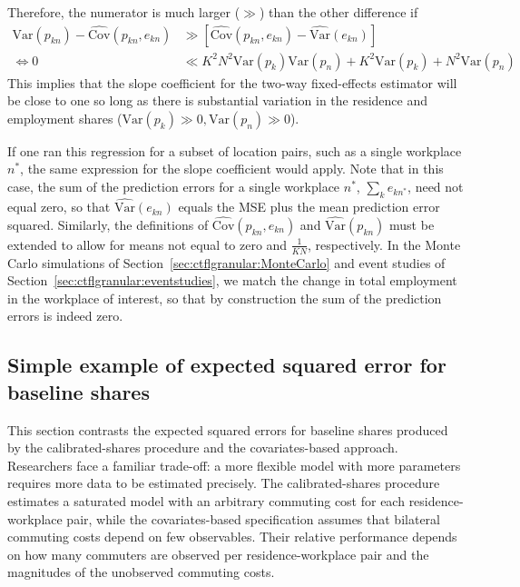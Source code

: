 \documentclass[11pt]{article}
\theoremstyle{definition}
\begin{document}
Therefore, the numerator is much larger ($\gg$) than the other difference if
\begin{align*}
\text{Var}(p_{kn}) - \widehat{\text{Cov}}(p_{kn},e_{kn})
&\gg
\left[\widehat{\text{Cov}}(p_{kn},e_{kn}) - \widehat{\text{Var}}(e_{kn})\right]
\\
\iff
0
&\ll
K^2 N^2 \text{Var}(p_{k}) \text{Var}(p_{n}) + K^2 \text{Var}(p_{k}) + N^2 \text{Var}(p_{n}) 
\end{align*}
This implies that the slope coefficient for the two-way fixed-effects estimator will be close to one so long as there is substantial variation in the residence and employment shares
($\text{Var}(p_{k}) \gg 0, \text{Var}(p_{n}) \gg 0$).

If one ran this regression for a subset of location pairs, such as a single workplace $n^*$,
the same expression for the slope coefficient would apply.
Note that in this case, the sum of the prediction errors for a single workplace $n^*$, $\sum_{k} e_{kn^*}$, need not equal zero,
so that $\widehat{\text{Var}}(e_{kn})$ equals the MSE plus the mean prediction error squared.
Similarly, the definitions of $\widehat{\text{Cov}}(p_{kn},e_{kn})$ and $\widehat{\text{Var}}(p_{kn})$
must be extended to allow for means not equal to zero and $\frac{1}{KN}$, respectively.
In the Monte Carlo simulations of Section~\ref{sec:ctflgranular:MonteCarlo} and event studies of Section~\ref{sec:ctflgranular:eventstudies},
we match the change in total employment in the workplace of interest,
so that by construction the sum of the prediction errors is indeed zero.

\subsection{Simple example of expected squared error for baseline shares}\label{sec:appendix:theory:TWFE:baselineerror}

This section contrasts the expected squared errors for baseline shares produced by the calibrated-shares procedure and the covariates-based approach.
Researchers face a familiar trade-off: a more flexible model with more parameters requires more data to be estimated precisely.
The calibrated-shares procedure estimates a saturated model with an arbitrary commuting cost for each residence-workplace pair,
while the covariates-based specification assumes that bilateral commuting costs depend on few observables.
Their relative performance depends on how many commuters are observed per residence-workplace pair and the magnitudes of the unobserved commuting costs.
\end{document}
